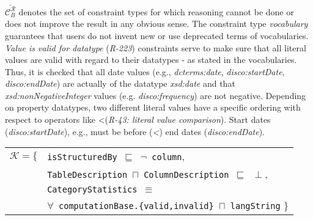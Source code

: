 \documentclass{llncs}
\newcommand{\ms}[1]{\texttt{#1}}
\newenvironment{DL}{
  \vspace{0cm}
	\begin{center}
  \begin{tabular}{c l}

}{
  \end{tabular}
	\end{center}
}
\begin{document}
{$\overline{\mathcal{C}_B ^{\mathcal{R}}}$  denotes the set of constraint types for which reasoning cannot be done or does not improve the result in any obvious sense.
The constraint type \emph{vocabulary} guarantees that users do not invent new or use deprecated terms of vocabularies.
\emph{Value is valid for datatype} (\emph{R-223}) constraints serve to make sure that all literal values are valid with regard to their datatypes - as stated in the vocabularies.
Thus, it is checked that all date values (e.g., {{\em dcterms:date}, \em disco:startDate}, {\em disco:endDate}) are actually of the datatype \emph{xsd:date} and that \emph{xsd:nonNegativeInteger} values (e.g. \emph{disco:frequency}) are not negative.
Depending on property datatypes, two different literal values have
a specific ordering with respect to operators like \textless  (\emph{R-43: literal value comparison}).
Start dates (\emph{disco:startDate}), e.g., must be before (\emph{\textless}) end dates (\emph{disco:endDate}).

\begin{center}
\begin{DL} 
$\mathcal{K}=\{$ 
	&\ms{isStructuredBy $\sqsubseteq$ $\neg$ column}, \\
	&\ms{TableDescription $\sqcap$ ColumnDescription $\sqsubseteq$ $\perp$}, \\
	&\ms{CategoryStatistics $\equiv$} \\
	&\ms{$\forall$ computationBase.\{valid,invalid\} $\sqcap$ langString}
 \}\\ 
\end{DL}
\end{center}

}
\end{document}
